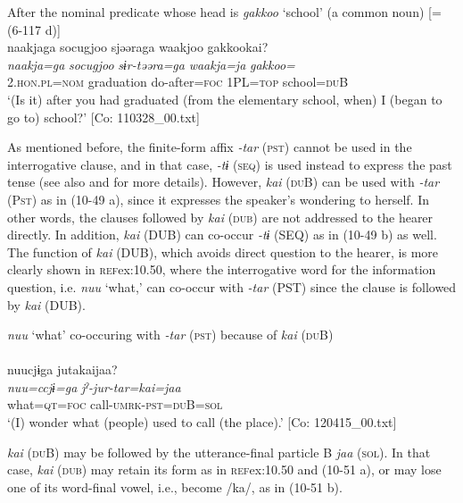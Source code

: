   \ex After the nominal predicate whose head is \textit{gakkoo} ‘school’ (a common noun) [= (6-117 d)]\\
      \glll    naakjaga  {\textbar}socugjoo{\textbar}  sjəəraga  waakjoo  {\textbar}gakkoo{\textbar}kai?\\
    \textit{naakja=ga}  \textit{socugjoo}  \textit{sɨr-təəra=ga}  \textit{waakja=ja}  \textit{gakkoo=}\\
    2.\textsc{hon}.\textsc{pl}=\textsc{nom}  graduation  do-after=\textsc{foc}  1PL=\textsc{top}  school=\textsc{du}B\\
    \glt     ‘(Is it) after you had graduated (from the elementary school, when) I (began to go to) school?’  [Co: 110328\_00.txt]
    \z
\z

As mentioned before, the finite-form affix \textit{{}-tar} (\textsc{pst}) cannot be used in the interrogative clause, and in that case, \textit{{}-tɨ} (\textsc{seq}) is used instead to express the past tense (see also  and  for more details). However, \textit{kai} (\textsc{du}B) can be used with \textit{{}-tar} (P\textsc{st}) as in (10-49 a), since it expresses the speaker’s wondering to herself. In other words, the clauses followed by \textit{kai} (\textsc{dub}) are not addressed to the hearer directly. In addition, \textit{kai} (DUB) can co-occur \textit{{}-tɨ} (SEQ) as in (10-49 b) as well. The function of \textit{kai} (DUB), which avoids direct question to the hearer, is more clearly shown in \textsc{ref}{ex:10.50}, where the interrogative word for the information question, i.e. \textit{nuu} ‘what,’ can co-occur with \textit{{}-tar} (PST) since the clause is followed by \textit{kai} (DUB).

\ea\label{ex:10.50}   \textit{nuu} ‘what’ co-occuring with \textit{{}-tar} (\textsc{pst}) because of \textit{kai} (\textsc{du}B) \\\\
      \glll    nuucjɨga  jutakaijaa?\\
    \textit{nuu=ccjɨ=ga}  \textit{jˀ-jur-tar=kai=jaa}\\
    what=\textsc{qt}=\textsc{foc}  call-\textsc{umrk}-\textsc{pst}=\textsc{du}B=\textsc{sol}\\
\glt     ‘(I) wonder what (people) used to call (the place).’  [Co: 120415\_00.txt]
\z

\textit{kai} (\textsc{du}B) may be followed by the utterance-final particle B \textit{jaa} (\textsc{sol}). In that case, \textit{kai} (\textsc{dub}) may retain its form as in \textsc{ref}{ex:10.50} and (10-51 a), or may lose one of its word-final vowel, i.e., become /ka/, as in (10-51 b).

